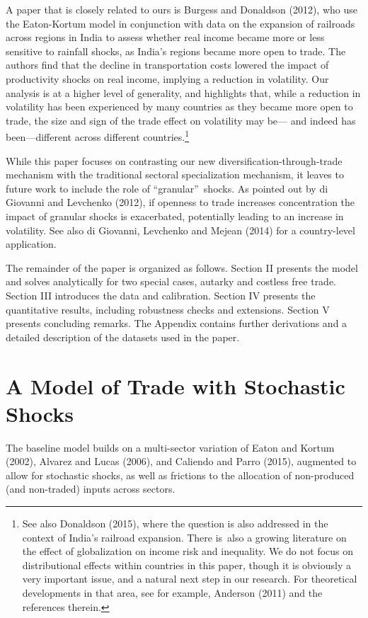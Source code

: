 \documentclass[12pt]{article}
\begin{document}
A paper that is closely related to ours is Burgess and Donaldson (2012), who
use the Eaton-Kortum model in conjunction with data on the expansion of
railroads across regions in India to assess whether real income became more
or less sensitive to rainfall shocks, as India's regions became more open to
trade. The authors find that the decline in transportation costs lowered the
impact of productivity shocks on real income, implying a reduction in
volatility. Our analysis is at a higher level of generality, and
highlights that, while a reduction in volatility has been experienced by
many countries as they became more open to trade, the size and sign of the
trade effect on volatility may be--- and indeed has been---different across
different countries.\footnote{%
See also Donaldson (2015), where the question is also addressed in the
context of India's railroad expansion. There is\ also a growing literature
on the effect of globalization on income risk and inequality. We do not
focus on distributional effects within countries in this paper, though it is
obviously a very important issue, and a natural next step in our research.
For theoretical developments in that area, see for example, Anderson (2011)
and the references therein.}

While this paper focuses on contrasting our new
diversification-through-trade mechanism with the traditional sectoral
specialization mechanism, it leaves to future work to include the role of
\textquotedblleft granular\textquotedblright\ shocks. As pointed out by di
Giovanni and Levchenko (2012), if openness to trade increases concentration
the impact of granular shocks is exacerbated, potentially leading to an
increase in volatility. See also di Giovanni, Levchenko and Mejean (2014)
for a country-level application.

The remainder of the paper is organized as follows. Section II presents the
model and solves analytically for two special cases, autarky and costless
free trade. Section III introduces the data and calibration. Section IV
presents the quantitative results, including robustness checks and
extensions. Section V presents concluding remarks. The Appendix contains
further derivations and a detailed description of the datasets used in the
paper.

\section{A Model of Trade with Stochastic Shocks}

The baseline model builds on a multi-sector variation of Eaton and Kortum
(2002), Alvarez and Lucas (2006), and Caliendo and Parro (2015), augmented
to allow for stochastic shocks, as well as frictions to the allocation of
non-produced (and non-traded) inputs across sectors.
\end{document}
